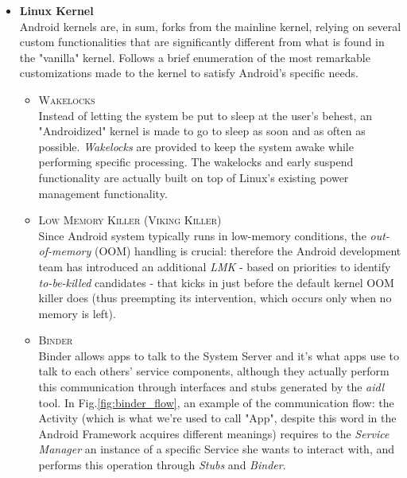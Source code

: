 \begin{itemize}
\item \textbf{Linux Kernel}\\
Android kernels are, in sum, forks from the mainline kernel, relying on several custom 	functionalities that are significantly different from what is found in the "vanilla" kernel. Follows a brief enumeration of the most remarkable customizations made to the kernel to satisfy Android's specific needs.
	\begin{itemize}
	\item \textsc{Wakelocks}\\
	Instead of letting the system be put to sleep at the user's behest, an "Androidized"
kernel is made to go to sleep as soon and as often as possible. \textit{Wakelocks} are provided to keep the system awake while performing specific processing. The wakelocks and early suspend functionality are actually built on top of Linux's existing power management functionality.
	\item \textsc{Low Memory Killer (Viking Killer)}\\
	Since Android system typically runs in low-memory conditions, the \textit{out-of-memory} (OOM) handling is crucial: therefore the Android development team has introduced an additional \textit{LMK} - based on priorities to identify \textit{to-be-killed} candidates - that kicks in just before the default kernel OOM killer does (thus preempting its intervention, which occurs only when no memory is left).
	\item \textsc{Binder}\\
	Binder allows apps to talk to the System Server and it's what apps use to talk to each others' service components, although they actually perform this communication through  interfaces and stubs generated by the \textit{aidl} tool. In Fig.\ref{fig:binder_flow}, an example of the communication flow: the Activity (which is what we're used to call "App", despite this word in the Android Framework acquires different meanings) requires to the \textit{Service Manager} an instance of a specific Service she wants to interact with, and performs this operation through \textit{Stubs} and \textit{Binder}.
		\begin{figure}[!htb]
			\centering

\end{figure}
\end{itemize}
\end{itemize}
